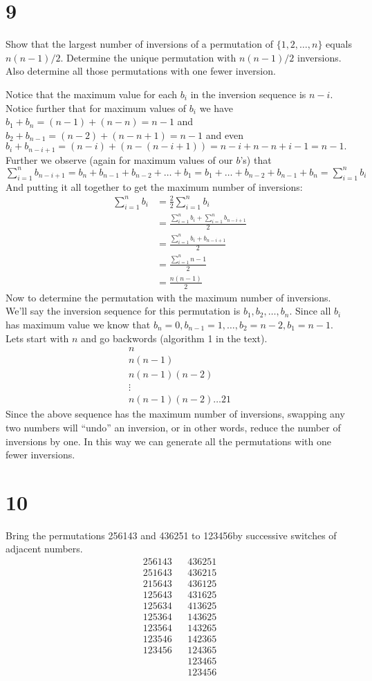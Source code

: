 \documentclass{article}
\begin{document}
\section*{9}
Show that the largest number of inversions of a permutation of $\{1,2,\dots,n\}$ equals $n(n-1)/2$. Determine the unique permutation with $n(n-1)/2$ inversions. Also determine all those permutations with one fewer inversion.

Notice that the maximum value for each $b_i$ in the inversion sequence is $n-i$. Notice further that for maximum values of $b_i$ we have $b_1+b_n=(n-1)+(n-n)=n-1$ and $b_2+b_{n-1}=(n-2)+(n-n+1)=n-1$ and even $b_i+b_{n-i+1}=(n-i)+(n-(n-i+1))=n-i+n-n+i-1=n-1.$ Further we observe (again for maximum values of our $b$'s) that $\sum\limits_{i=1}^n{b_{n-i+1}}=b_n+b_{n-1}+b_{n-2}+\dots+b_1=b_1+\dots+b_{n-2}+b_{n-1}+b_n=\sum\limits_{i=1}^n{b_i}$ And putting it all together to get the maximum number of inversions:
\begin{align*}
  \sum\limits_{i=1}^n{b_i}&=\frac{2}{2}\sum\limits_{i=1}^n{b_i}\\
  &=\frac{\sum\limits_{i=1}^n{b_i}+\sum\limits_{i=1}^n{b_{n-i+1}}}{2}\\
  &=\frac{\sum\limits_{i=1}^n{b_i+b_{n-i+1}}}{2}\\
  &=\frac{\sum\limits_{i=1}^n{n-1}}{2}\\
  &=\frac{n(n-1)}{2}
\end{align*}
Now to determine the permutation with the maximum number of inversions. We'll say the inversion sequence for this permutation is $b_1,b_2,\dots,b_n$. Since all $b_i$ has maximum value we know that $b_n=0,b_{n-1}=1,\dots,b_2=n-2,b_1=n-1$. Lets start with $n$ and go backwords (algorithm 1 in the text). 
\begin{align*}
  n\\
  n(n-1)\\
  n(n-1)(n-2)\\
  \vdots\\
  n(n-1)(n-2)\dots21
\end{align*}
Since the above sequence has the maximum number of inversions, swapping any two numbers will ``undo'' an inversion, or in other words, reduce the number of inversions by one. In this way we can generate all the permutations with one fewer inversions.
\section*{10}
Bring the permutations 256143 and 436251 to 123456by successive switches of adjacent numbers.
\begin{align*}
  256143&&436251\\
  251643&&436215\\
  215643&&436125\\
  125643&&431625\\
  125634&&413625\\
  125364&&143625\\
  123564&&143265\\
  123546&&142365\\
  123456&&124365\\
  &&123465\\
  &&123456\\
\end{align*}
\end{document}
